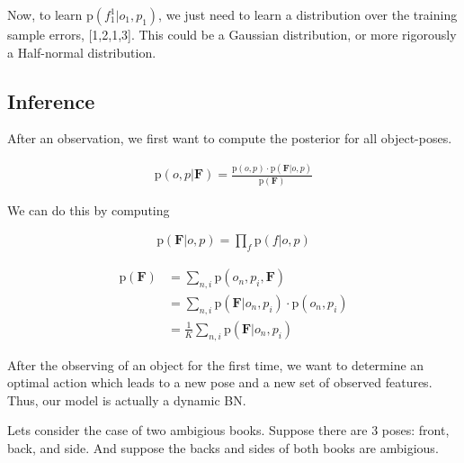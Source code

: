 \documentclass[11pt]{article}
\newcommand{\SetOf}[1]{\mathbf{#1}} %
\newcommand{\prob}[1]{\text{p}(#1)} %
\newcommand{\Eq}[1]{\begin{align*}#1\end{align*}} %
\begin{document}
	Now, to learn $\prob{f_1^1|o_1,p_1}$, we just need to learn a distribution over the training sample errors, [1,2,1,3]. This could be a Gaussian distribution, or more rigorously a Half-normal distribution. 
\subsection{Inference}

	After an observation, we first want to compute the posterior for all object-poses.

	\Eq{\prob{o,p|\SetOf{F}} = \frac{\prob{o,p} \cdot \prob{\SetOf{F}|o,p}}{\prob{\SetOf{F}}}}

	We can do this by computing

	\Eq{\prob{\SetOf{F}|o,p} = \prod_f \prob{f|o,p}}

	\Eq{\prob{\SetOf{F}} &= \sum_{n,i} \prob{o_n,p_i,\SetOf{F}}\\
	&= \sum_{n,i} \prob{\SetOf{F}|o_n,p_i}\cdot \prob{o_n,p_i}\\
	&= \frac{1}{K} \sum_{n,i} \prob{\SetOf{F}|o_n,p_i}}

	After the observing of an object for the first time, we want to determine an optimal action which leads to a new pose and a new set of observed features. Thus, our model is actually a dynamic BN. 

	\begin{center}
	\end{center}

	Lets consider the case of two ambigious books. Suppose there are 3 poses: front, back, and side. And suppose the backs and sides of both books are ambigious. 
\end{document}
